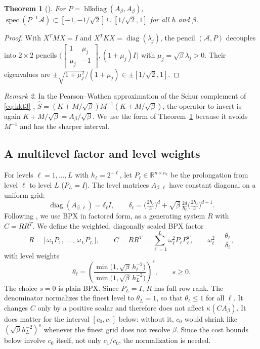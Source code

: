 \documentclass[11pt,a4paper]{article}
\newcommand{\R}{\mathbb{R}}
\newcommand{\A}{\mathcal{A}}
\newtheorem{theorem}{Theorem}[section]
\theoremstyle{remark}
\newtheorem{remark}[theorem]{Remark}
\begin{document}
\begin{theorem}[\cite{SZ07}]\label{thm:sz}
For $P=\operatorname{blkdiag}(A_\beta,A_\beta)$,
$\operatorname{spec}(P^{-1}\A)\subset[-1,-1/\sqrt2]\cup[1/\sqrt2,1]$ for all $h$ and $\beta$.
\end{theorem}
\begin{proof}
With $X^TMX=I$ and $X^TKX=\operatorname{diag}(\lambda_j)$, the pencil $(\A,P)$ decouples into
$2\times2$ pencils $\big(\begin{bmatrix}1&\mu_j\\ \mu_j&-1\end{bmatrix},(1+\mu_j)I\big)$ with
$\mu_j=\sqrt\beta\lambda_j>0$. Their eigenvalues are
$\pm\sqrt{1+\mu_j^2}/(1+\mu_j)\in\pm[1/\sqrt2,1]$.
\end{proof}

\begin{remark}
In the Pearson--Wathen approximation of the Schur complement of
\eqref{eq:kkt3} \cite{PW12}, $\widehat S=(K+M/\sqrt\beta)M^{-1}(K+M/\sqrt\beta)$,
the operator to invert is again $K+M/\sqrt\beta=A_\beta/\sqrt\beta$. We use the
form of Theorem~\ref{thm:sz} because it avoids $M^{-1}$ and has the sharper
interval.
\end{remark}

\subsection{A multilevel factor and level weights}\label{sec:weights}

For levels $\ell=1,\dots,L$ with $h_\ell=2^{-\ell}$, let $P_\ell\in\R^{n\times n_\ell}$ be the
prolongation from level $\ell$ to level $L$ ($P_L=I$). The level matrices
$A_{\beta,\ell}$ have constant diagonal on a uniform grid:
\[
\operatorname{diag}(A_{\beta,\ell})=\delta_\ell I,\qquad
\delta_\ell=\big(\tfrac{2h_\ell}{3}\big)^d+\sqrt\beta\,\tfrac{2d}{h_\ell}\big(\tfrac{2h_\ell}{3}\big)^{d-1}.
\]
Following \cite[Sec.~5]{DP26}, we use BPX in factored form, as a generating
system $R$ with $C=RR^T$. We define the weighted, diagonally scaled BPX factor
\begin{equation}\label{eq:bpx}
R=\big[\,\omega_1P_1,\ \dots,\ \omega_LP_L\,\big],\qquad
C=RR^T=\sum_{\ell=1}^L\omega_\ell^2P_\ell P_\ell^T,\qquad
\omega_\ell^2=\frac{\theta_\ell}{\delta_\ell},
\end{equation}
with level weights
\begin{equation}\label{eq:theta}
\theta_\ell=\left(\frac{\min\big(1,\sqrt\beta\,h_\ell^{-2}\big)}{\min\big(1,\sqrt\beta\,h_L^{-2}\big)}\right)^{s},\qquad s\ge0 .
\end{equation}
The choice $s=0$ is plain BPX. Since $P_L=I$, $R$ has full row rank. The
denominator normalizes the finest level to $\theta_L=1$, so that $\theta_\ell\le1$
for all $\ell$. It changes $C$ only by a positive scalar and therefore does not
affect $\kappa(CA_\beta)$. It does matter for the interval $[c_0,c_1]$ below:
without it, $c_0$ would shrink like $(\sqrt\beta h_L^{-2})^s$ whenever the finest
grid does not resolve $\beta$. Since the cost bounds below involve $c_0$
itself, not only $c_1/c_0$, the normalization is needed.
\end{document}
